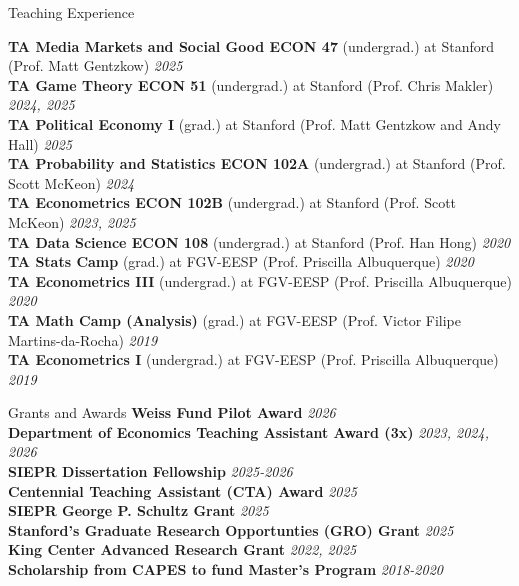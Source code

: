 \documentclass{resume} %
\begin{document}
\begin{rSection}{Teaching Experience}

{\bf TA Media Markets and Social Good ECON 47} (undergrad.) at Stanford (Prof. Matt Gentzkow) \hfill {\em 2025} \\
\smallskip
{\bf TA Game Theory ECON 51} (undergrad.) at Stanford (Prof. Chris Makler) \hfill {\em 2024, 2025} \\
\smallskip
{\bf TA Political Economy I} (grad.) at Stanford (Prof. Matt Gentzkow and Andy Hall) \hfill {\em 2025} \\
\smallskip
{\bf TA Probability and Statistics ECON 102A} (undergrad.) at Stanford (Prof. Scott McKeon) \hfill {\em 2024} \\
\smallskip
{\bf TA Econometrics  ECON 102B} (undergrad.) at Stanford (Prof. Scott McKeon) \hfill {\em 2023, 2025} \\
\smallskip
{\bf TA Data Science ECON 108} (undergrad.) at Stanford (Prof. Han Hong) \hfill {\em 2020} \\
\smallskip
{\bf TA Stats Camp} (grad.) at FGV-EESP (Prof. Priscilla Albuquerque) \hfill {\em 2020} \\
\smallskip
{\bf TA Econometrics III} (undergrad.) at FGV-EESP (Prof. Priscilla Albuquerque) \hfill {\em 2020} \\
\smallskip
{\bf TA Math Camp (Analysis)} (grad.) at FGV-EESP (Prof. Victor Filipe Martins-da-Rocha) \hfill {\em 2019} \\
\smallskip
{\bf TA Econometrics I} (undergrad.) at FGV-EESP (Prof. Priscilla Albuquerque) \hfill {\em 2019} \\
\smallskip

\end{rSection}

\begin{rSection}{Grants and Awards}
{\bf Weiss Fund Pilot Award} \hfill {\em 2026} \\
{\bf Department of Economics Teaching Assistant Award (3x)} \hfill {\em 2023, 2024, 2026} \\
{\bf SIEPR Dissertation Fellowship} \hfill {\em 2025-2026} \\
{\bf Centennial Teaching Assistant (CTA) Award} \hfill {\em 2025} \\
{\bf SIEPR George P. Schultz Grant} \hfill {\em 2025} \\
{\bf Stanford's Graduate Research Opportunties (GRO) Grant} \hfill {\em 2025} \\
{\bf King Center Advanced Research Grant} \hfill {\em 2022, 2025} \\
{\bf Scholarship from CAPES to fund Master's Program} \hfill {\em 2018-2020} \\
\end{rSection}
\end{document}
